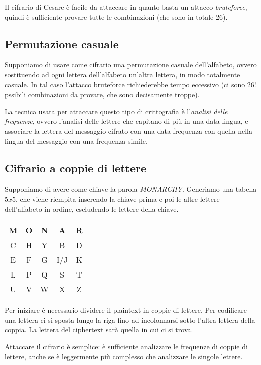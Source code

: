 \documentclass[a4paper, 11pt]{article}
\begin{document}
	Il cifrario di Cesare è facile da attaccare in quanto basta un attacco \textit{bruteforce}, quindi è sufficiente provare tutte le combinazioni (che sono in totale 26).
	
	\subsection{Permutazione casuale}
	Supponiamo di usare come cifrario una permutazione casuale dell'alfabeto, ovvero sostituendo ad ogni lettera dell'alfabeto un'altra lettera, in modo totalmente casuale. In tal caso l'attacco bruteforce richiederebbe tempo eccessivo (ci sono $26!$ pssibili combinazioni da provare, che sono decisamente troppe). 
	
	La tecnica usata per attaccare questo tipo di crittografia è l'\textit{analisi delle frequenze}, ovvero l'analisi delle lettere che capitano di più in una data lingua, e associare la lettera del messaggio cifrato con una data frequenza con quella nella lingua del messaggio con una frequenza simile.
	
	\subsection{Cifrario a coppie di lettere}
	Supponiamo di avere come chiave la parola \textit{MONARCHY}. Generiamo una tabella $5 x 5$, che viene riempita inserendo la chiave prima e poi le altre lettere dell'alfabeto in ordine, escludendo le lettere della chiave. \\
	
	\begin{center}
		\begin{tabular}{|c|c|c|c|c|}
			\hline
			M &O &N &A &R\\[1pt]
			\hline
			C &H &Y &B &D\\[1pt]
			\hline
			E &F &G &I/J &K\\[1pt]
			\hline
			L &P &Q &S &T\\[1pt]
			\hline
			U &V &W &X &Z\\[1pt]
			\hline
		\end{tabular} 
	\end{center}
	
	Per iniziare è necessario dividere il plaintext in coppie di lettere.
	Per codificare una lettera ci si sposta lungo la riga fino ad incolonnarsi sotto l'altra lettera della coppia. La lettera del ciphertext sarà quella in cui ci si trova.
	
	Attaccare il cifrario è semplice: è sufficiente analizzare le frequenze di coppie di lettere, anche se è leggermente più complesso che analizzare le singole lettere.
	
\end{document}
